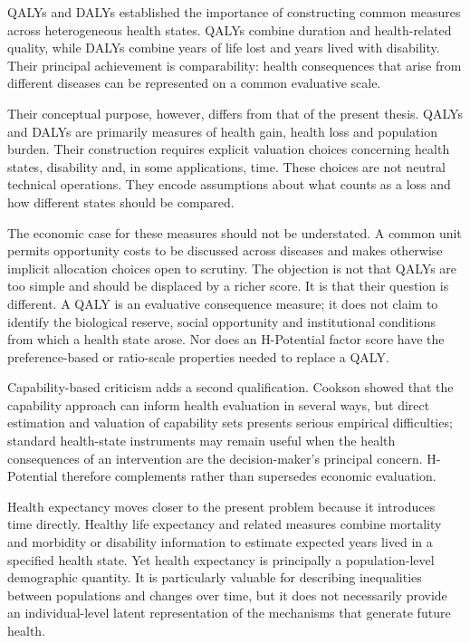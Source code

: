 QALYs and DALYs established the importance of constructing common measures across heterogeneous health states. QALYs combine duration and health-related quality, while DALYs combine years of life lost and years lived with disability. Their principal achievement is comparability: health consequences that arise from different diseases can be represented on a common evaluative scale. \cite{whitehead_2010,drummond2015,sundmacher_2017}

Their conceptual purpose, however, differs from that of the present thesis. QALYs and DALYs are primarily measures of health gain, health loss and population burden. Their construction requires explicit valuation choices concerning health states, disability and, in some applications, time. These choices are not neutral technical operations. They encode assumptions about what counts as a loss and how different states should be compared. \cite{drummond2015}

The economic case for these measures should not be understated. A common unit
permits opportunity costs to be discussed across diseases and makes otherwise
implicit allocation choices open to scrutiny. The objection is not that QALYs
are too simple and should be displaced by a richer score. It is that their
question is different. A QALY is an evaluative consequence measure; it does not
claim to identify the biological reserve, social opportunity and institutional
conditions from which a health state arose. Nor does an H-Potential factor score
have the preference-based or ratio-scale properties needed to replace a QALY.

Capability-based criticism adds a second qualification. Cookson showed that the
capability approach can inform health evaluation in several ways, but direct
estimation and valuation of capability sets presents serious empirical
difficulties; standard health-state instruments may remain useful when the
health consequences of an intervention are the decision-maker's principal
concern. \cite{cookson_2005} H-Potential therefore complements rather than
supersedes economic evaluation.

Health expectancy moves closer to the present problem because it introduces time directly. Healthy life expectancy and related measures combine mortality and morbidity or disability information to estimate expected years lived in a specified health state. \cite{who_hale_2019} Yet health expectancy is principally a population-level demographic quantity. It is particularly valuable for describing inequalities between populations and changes over time, but it does not necessarily provide an individual-level latent representation of the mechanisms that generate future health.

